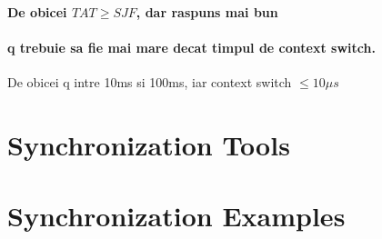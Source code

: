 \documentclass{article}
\begin{document}
\paragraph*{De obicei $TAT \ge SJF$, dar raspuns mai bun}
\paragraph*{q trebuie sa fie mai mare decat timpul de context switch.} De obicei q intre 10ms si 100ms, iar context switch $\le 10 \mu s$

\section[Ch6 Synchronization Tools]{Synchronization Tools}
\section[Ch7 Synchronization Examples]{Synchronization Examples}
\end{document}
